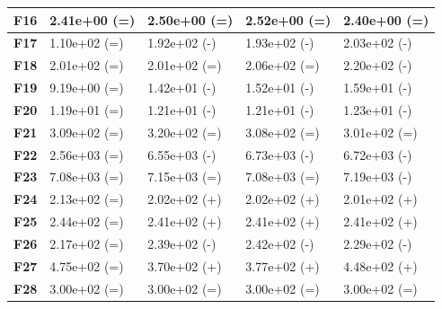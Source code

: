 \documentclass[12pt,a4paper]{report}
\begin{document}
{{{{{{\begin{table}[]
\begin{tabular}{|l|l|l|l|l|}
{\bf F16} & 2.41e+00 (=)        & 2.50e+00 (=)    & 2.52e+00 (=)     & 2.40e+00 (=)     \\ \hline
{\bf F17} & 1.10e+02 (=)        & 1.92e+02 (-)    & 1.93e+02 (-)     & 2.03e+02 (-)     \\ \hline
{\bf F18} & 2.01e+02 (=)        & 2.01e+02 (=)    & 2.06e+02 (=)     & 2.20e+02 (-)     \\ \hline
{\bf F19} & 9.19e+00 (=)        & 1.42e+01 (-)    & 1.52e+01 (-)     & 1.59e+01 (-)     \\ \hline
{\bf F20} & 1.19e+01 (=)        & 1.21e+01 (-)    & 1.21e+01 (-)     & 1.23e+01 (-)     \\ \hline
{\bf F21} & 3.09e+02 (=)        & 3.20e+02 (=)    & 3.08e+02 (=)     & 3.01e+02 (=)     \\ \hline
{\bf F22} & 2.56e+03 (=)        & 6.55e+03 (-)    & 6.73e+03 (-)     & 6.72e+03 (-)     \\ \hline
{\bf F23} & 7.08e+03 (=)        & 7.15e+03 (=)    & 7.08e+03 (=)     & 7.19e+03 (-)     \\ \hline
{\bf F24} & 2.13e+02 (=)        & 2.02e+02 (+)    & 2.02e+02 (+)     & 2.01e+02 (+)     \\ \hline
{\bf F25} & 2.44e+02 (=)        & 2.41e+02 (+)    & 2.41e+02 (+)     & 2.41e+02 (+)     \\ \hline
{\bf F26} & 2.17e+02 (=)        & 2.39e+02 (-)    & 2.42e+02 (-)     & 2.29e+02 (-)     \\ \hline
{\bf F27} & 4.75e+02 (=)        & 3.70e+02 (+)    & 3.77e+02 (+)     & 4.48e+02 (+)     \\ \hline
{\bf F28} & 3.00e+02 (=)        & 3.00e+02 (=)    & 3.00e+02 (=)     & 3.00e+02 (=)     \\ \hline
\end{tabular}
\end{table}

}}}}}}
\end{document}
